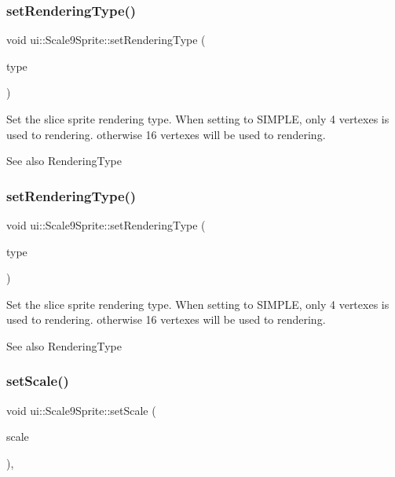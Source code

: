 \subsubsection{\texorpdfstring{set\+Rendering\+Type()}{setRenderingType()}\hspace{0.1cm}{\footnotesize\ttfamily [1/2]}}
{\footnotesize\ttfamily void ui\+::\+Scale9\+Sprite\+::set\+Rendering\+Type (\begin{DoxyParamCaption}\item[{Rendering\+Type}]{type }\end{DoxyParamCaption})}

Set the slice sprite rendering type. When setting to S\+I\+M\+P\+LE, only 4 vertexes is used to rendering. otherwise 16 vertexes will be used to rendering. \begin{DoxySeeAlso}{See also}
Rendering\+Type 
\end{DoxySeeAlso}
\mbox{\label{classui_1_1Scale9Sprite_a8c2f5c69134b3e363e62acf6ef28ea8b}} 
\subsubsection{\texorpdfstring{set\+Rendering\+Type()}{setRenderingType()}\hspace{0.1cm}{\footnotesize\ttfamily [2/2]}}
{\footnotesize\ttfamily void ui\+::\+Scale9\+Sprite\+::set\+Rendering\+Type (\begin{DoxyParamCaption}\item[{Rendering\+Type}]{type }\end{DoxyParamCaption})}

Set the slice sprite rendering type. When setting to S\+I\+M\+P\+LE, only 4 vertexes is used to rendering. otherwise 16 vertexes will be used to rendering. \begin{DoxySeeAlso}{See also}
Rendering\+Type 
\end{DoxySeeAlso}
\mbox{\label{classui_1_1Scale9Sprite_a6824394dc8d5f26668b5e6f8b3cae3ba}} 
\subsubsection{\texorpdfstring{set\+Scale()}{setScale()}\hspace{0.1cm}{\footnotesize\ttfamily [1/2]}}
{\footnotesize\ttfamily void ui\+::\+Scale9\+Sprite\+::set\+Scale (\begin{DoxyParamCaption}\item[{float}]{scale }\end{DoxyParamCaption})\hspace{0.3cm}{\ttfamily [override]}, {\ttfamily [virtual]}}



